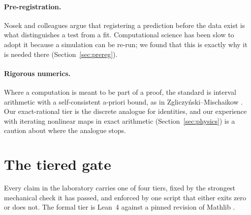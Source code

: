 \documentclass[11pt]{article}
\begin{document}
\paragraph{Pre-registration.} Nosek and colleagues \cite{nosek2018} argue that registering a
prediction before the data exist is what distinguishes a test from a fit. Computational science
has been slow to adopt it because a simulation can be re-run; we found that this is exactly why
it is needed there (Section~\ref{sec:prereg}).

\paragraph{Rigorous numerics.} Where a computation is meant to be part of a proof, the
standard is interval arithmetic with a self-consistent a-priori bound, as in
Zgliczy\'nski--Mischaikow \cite{zgliczynski2001}. Our exact-rational tier is the discrete
analogue for identities, and our experience with iterating nonlinear maps in exact arithmetic
(Section~\ref{sec:physics}) is a caution about where the analogue stops.

\section{The tiered gate}
\label{sec:tiers}

Every claim in the laboratory carries one of four tiers, fixed by the strongest mechanical
check it has passed, and enforced by one script that either exits zero or does not. The
formal tier is Lean~4 \cite{lean4} against a pinned revision of Mathlib \cite{mathlib}.
\end{document}
